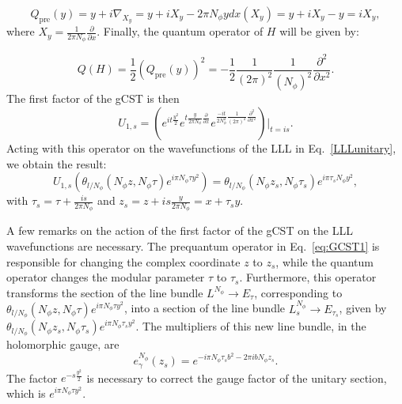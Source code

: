 \documentclass[a4paper,11pt]{article}
\begin{document}
\begin{equation}
    Q_{\mathrm{pre}}(y) = y+i\nabla_{X_{y}} = y + iX_{y}-2\pi N_{\phi}ydx(X_{y}) = y + iX_{y} - y = iX_{y},
\end{equation}
where $X_{y} = \frac{1}{2\pi N_{\phi}} \frac{\partial}{\partial x}$. Finally, the quantum operator of $H$ will be given by:

\begin{equation}
    Q(H) = \frac{1}{2}(Q_{\mathrm{pre}}(y))^2 = -\frac{1}{2}\frac{1}{(2\pi)^2}\frac{1}{(N_{\phi})^2}\frac{\partial^{2}}{\partial x^2}.
\end{equation}
The first factor of the gCST is then
\begin{equation}
   U_{1,s}=\left(e^{it\frac{y^2}{2}}e^{t\frac{y}{2\pi N_{\phi}}\frac{\partial}{\partial x}}e^{\frac{-it}{2N^2_{\phi}}\frac{1}{(2\pi)^2}\frac{\partial^2}{\partial x^2}}\right)\bigg|_{t=is}.
   \label{eq:GCST1}
\end{equation}
Acting with this operator on the wavefunctions of the LLL in Eq.~\eqref{LLLunitary}, we obtain the result:
\begin{equation}
 U_{1,s}
\left(\theta_{l/N_{\phi}}(N_{\phi}z,N_{\phi}\tau)e^{i\pi N_{\phi}\tau y^2}\right) = \theta_{l/N_{\phi}}(N_{\phi}z_{s},N_{\phi}\tau_{s})e^{i\pi\tau_s N_{\phi}y^2},
\label{eq:evolutionLLL}
\end{equation}
with $\tau_{s} = \tau + \frac{is}{2\pi N_{\phi}}$ and $z_{s} = z + is \frac{y}{2\pi N_{\phi}} = x + \tau_{s} y$. 

A few remarks on the action of the first factor of the gCST on the LLL wavefunctions are necessary. The prequantum operator in Eq.~\eqref{eq:GCST1} is responsible for changing the complex coordinate $z$ to $z_s$, while the quantum operator changes the modular parameter $\tau$ to $\tau_s$. Furthermore, this operator transforms the section of the line bundle $L^{N_{\phi}} \to E_{\tau}$, corresponding to $\theta_{l/N_{\phi}}(N_{\phi}z, N_{\phi}\tau) e^{i\pi N_{\phi} \tau y^2}$, into a section of the line bundle $L^{N_{\phi}}_{s} \to E_{\tau_{s}}$, given by $\theta_{l/N_{\phi}}(N_{\phi}z_{s}, N_{\phi} \tau_{s}) e^{i\pi N_{\phi} \tau_{s} y^2}$. The multipliers of this new line bundle, in the holomorphic gauge, are
\begin{equation}
    e^{N_{\phi}}_{\gamma}(z_{s}) = e^{-i\pi N_{\phi}\tau_{s}b^2-2\pi ibN_{\phi}z_{s}}.
    \label{multipliersevolved}
\end{equation}
The factor $e^{-s\frac{y^2}{2}}$ is necessary to correct the gauge factor of the unitary section, which is $e^{i\pi N_{\phi} \tau y^2}$. 
\end{document}
